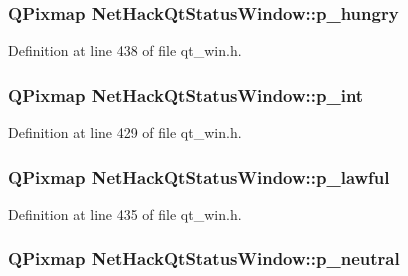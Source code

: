 \hypertarget{classNetHackQtStatusWindow_a8b526df074a2861e66adc1333c969f00}{
\subsubsection[{p\+\_\+hungry}]{\setlength{\rightskip}{0pt plus 5cm}Q\+Pixmap Net\+Hack\+Qt\+Status\+Window\+::p\+\_\+hungry\hspace{0.3cm}{\ttfamily [private]}}}\label{classNetHackQtStatusWindow_a8b526df074a2861e66adc1333c969f00}


Definition at line 438 of file qt\+\_\+win.\+h.

\hypertarget{classNetHackQtStatusWindow_afad056ddb53c609ffd53c6f609456bbc}{
\subsubsection[{p\+\_\+int}]{\setlength{\rightskip}{0pt plus 5cm}Q\+Pixmap Net\+Hack\+Qt\+Status\+Window\+::p\+\_\+int\hspace{0.3cm}{\ttfamily [private]}}}\label{classNetHackQtStatusWindow_afad056ddb53c609ffd53c6f609456bbc}


Definition at line 429 of file qt\+\_\+win.\+h.

\hypertarget{classNetHackQtStatusWindow_a51952058ee0062a27d0d9f3a8f0b114b}{
\subsubsection[{p\+\_\+lawful}]{\setlength{\rightskip}{0pt plus 5cm}Q\+Pixmap Net\+Hack\+Qt\+Status\+Window\+::p\+\_\+lawful\hspace{0.3cm}{\ttfamily [private]}}}\label{classNetHackQtStatusWindow_a51952058ee0062a27d0d9f3a8f0b114b}


Definition at line 435 of file qt\+\_\+win.\+h.

\hypertarget{classNetHackQtStatusWindow_ac34e439730c33614876381efb3e545ec}{
\subsubsection[{p\+\_\+neutral}]{\setlength{\rightskip}{0pt plus 5cm}Q\+Pixmap Net\+Hack\+Qt\+Status\+Window\+::p\+\_\+neutral\hspace{0.3cm}{\ttfamily [private]}}}\label{classNetHackQtStatusWindow_ac34e439730c33614876381efb3e545ec}


